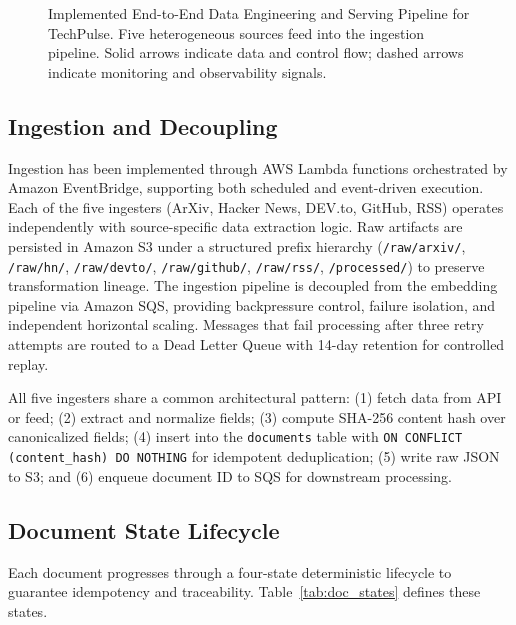 \documentclass[12pt,a4paper]{report}
\begin{document}
\begin{figure}[H]
{\begin{tikzpicture}[node distance=0.4cm and 0.5cm, font=\small]
\end{tikzpicture}%
}
\caption{Implemented End-to-End Data Engineering and Serving Pipeline for TechPulse. Five heterogeneous sources feed into the ingestion pipeline. Solid arrows indicate data and control flow; dashed arrows indicate monitoring and observability signals.}
\label{fig:pipeline}
\end{figure}

\subsection{Ingestion and Decoupling}

Ingestion has been implemented through AWS Lambda functions orchestrated by Amazon EventBridge, supporting both scheduled and event-driven execution. Each of the five ingesters (ArXiv, Hacker News, DEV.to, GitHub, RSS) operates independently with source-specific data extraction logic. Raw artifacts are persisted in Amazon S3 under a structured prefix hierarchy (\texttt{/raw/arxiv/}, \texttt{/raw/hn/}, \texttt{/raw/devto/}, \texttt{/raw/github/}, \texttt{/raw/rss/}, \texttt{/processed/}) to preserve transformation lineage. The ingestion pipeline is decoupled from the embedding pipeline via Amazon SQS, providing backpressure control, failure isolation, and independent horizontal scaling. Messages that fail processing after three retry attempts are routed to a Dead Letter Queue with 14-day retention for controlled replay.

All five ingesters share a common architectural pattern: (1) fetch data from API or feed; (2) extract and normalize fields; (3) compute SHA-256 content hash over canonicalized fields; (4) insert into the \texttt{documents} table with \texttt{ON CONFLICT (content\_hash) DO NOTHING} for idempotent deduplication; (5) write raw JSON to S3; and (6) enqueue document ID to SQS for downstream processing.

\subsection{Document State Lifecycle}

Each document progresses through a four-state deterministic lifecycle to guarantee idempotency and traceability. Table~\ref{tab:doc_states} defines these states.
\end{document}
